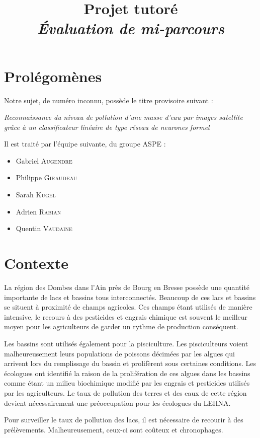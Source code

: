 \documentclass[a4paper, 12pt]{article}
\title{Projet tutoré \\ \small\textit{Évaluation de mi-parcours}}
\begin{document}
\maketitle

\section{Prolégomènes}
Notre sujet, de numéro inconnu, possède le titre provisoire suivant :
\begin{center}
	\emph{\og Reconnaissance du niveau de pollution d’une masse d’eau par images satellite grâce à un classificateur linéaire de type réseau de neurones formel \fg}
\end{center}
Il est traité par l'équipe suivante, du groupe ASPE :
\vspace{0.3cm}
\begin{itemize}
	\item Gabriel \textsc{Augendre}
	\item Philippe \textsc{Giraudeau}
	\item Sarah \textsc{Kugel}
	\item Adrien \textsc{Rabian}
	\item Quentin \textsc{Vaudaine}
\end{itemize}

\section{Contexte}
La région des Dombes dans l'Ain près de Bourg en Bresse possède une quantité importante de lacs et bassins tous interconnectés. Beaucoup de ces lacs et bassins se situent à proximité de champs agricoles. Ces champs étant utilisés de manière intensive, le recours à des pesticides et engrais chimique est souvent le meilleur moyen pour les agriculteurs de garder un rythme de production conséquent.

Les bassins sont utilisés également pour la pisciculture. Les pisciculteurs voient malheureusement  leurs populations de poissons décimées par les algues qui arrivent lors du remplissage du bassin et prolifèrent sous certaines conditions. Les écologues ont identifié la raison de la prolifération de ces algues dans les bassins comme étant un milieu biochimique modifié par les engrais et pesticides utilisés par les agriculteurs. Le taux de pollution des terres et des eaux de cette région devient nécessairement une préoccupation pour les écologues du LEHNA.

Pour surveiller le taux de pollution des lacs, il est nécessaire de recourir à des prélèvements. Malheureusement, ceux-ci sont coûteux et chronophages.
\end{document}
